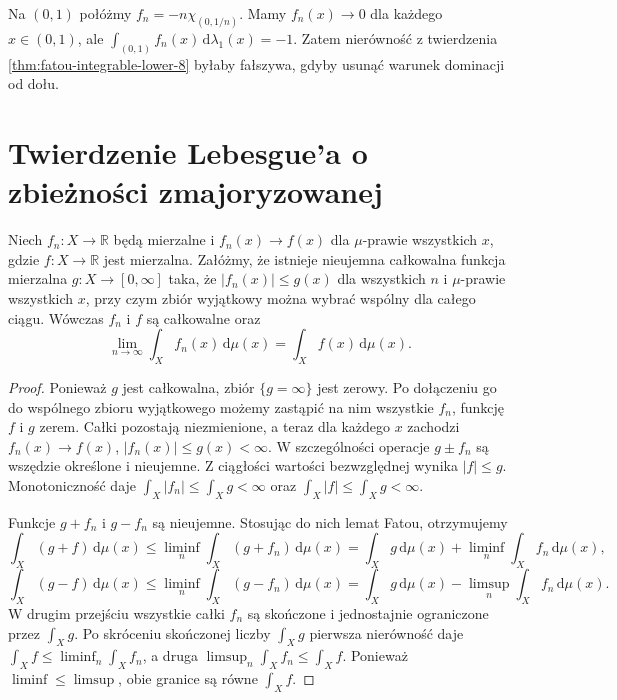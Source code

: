 \begin{przyklad}
Na $(0,1)$ połóżmy $f_n=-n\chi_{(0,1/n)}$.
Mamy $f_n(x)\to0$ dla każdego $x\in(0,1)$,
ale $\int_{(0,1)}f_n(x)\,\mathrm d\lambda_1(x)=-1$.
Zatem nierówność z twierdzenia
\ref{thm:fatou-integrable-lower-8} byłaby fałszywa,
gdyby usunąć warunek dominacji od dołu.
\end{przyklad}

\section{Twierdzenie Lebesgue'a o zbieżności zmajoryzowanej}

\begin{twierdzenie}
\label{thm:dct}
Niech $f_n:X\to\mathbb R$ będą mierzalne i
$f_n(x)\to f(x)$ dla $\mu$-prawie wszystkich $x$, gdzie
$f:X\to\mathbb R$ jest mierzalna. Załóżmy, że
istnieje nieujemna całkowalna funkcja mierzalna
$g:X\to[0,\infty]$ taka, że
$|f_n(x)|\le g(x)$ dla wszystkich $n$ i
$\mu$-prawie wszystkich $x$, przy czym zbiór
wyjątkowy można wybrać wspólny dla całego ciągu.
Wówczas $f_n$ i $f$ są całkowalne oraz
\begin{equation}\label{eq:dct}
\lim_{n\to\infty}\int_Xf_n(x)\,\mathrm d\mu(x)
=\int_Xf(x)\,\mathrm d\mu(x).
\end{equation}
\end{twierdzenie}
\begin{proof}
Ponieważ $g$ jest całkowalna, zbiór $\{g=\infty\}$
jest zerowy. Po dołączeniu go do wspólnego zbioru
wyjątkowego możemy zastąpić na nim wszystkie
$f_n$, funkcję $f$ i $g$ zerem. Całki pozostają
niezmienione, a teraz dla każdego $x$ zachodzi
$f_n(x)\to f(x)$, $|f_n(x)|\le g(x)<\infty$.
W szczególności operacje $g\pm f_n$ są wszędzie
określone i nieujemne.
Z ciągłości wartości bezwzględnej wynika $|f|\le g$.
Monotoniczność daje
$\int_X|f_n|\le\int_X g<\infty$ oraz
$\int_X|f|\le\int_X g<\infty$.

Funkcje $g+f_n$ i $g-f_n$ są nieujemne.
Stosując do nich lemat Fatou, otrzymujemy
\[
\int_X(g+f)\,\mathrm d\mu(x)
\le\liminf_n\int_X(g+f_n)\,\mathrm d\mu(x)
=\int_Xg\,\mathrm d\mu(x)+
\liminf_n\int_Xf_n\,\mathrm d\mu(x),
\]
\[
\int_X(g-f)\,\mathrm d\mu(x)
\le\liminf_n\int_X(g-f_n)\,\mathrm d\mu(x)
=\int_Xg\,\mathrm d\mu(x)-
\limsup_n\int_Xf_n\,\mathrm d\mu(x).
\]
W drugim przejściu wszystkie całki $f_n$ są
skończone i jednostajnie ograniczone przez $\int_X g$.
Po skróceniu skończonej liczby $\int_X g$ pierwsza
nierówność daje
$\int_X f\le\liminf_n\int_X f_n$, a druga
$\limsup_n\int_X f_n\le\int_X f$.
Ponieważ $\liminf\le\limsup$, obie granice
są równe $\int_X f$.
\end{proof}


